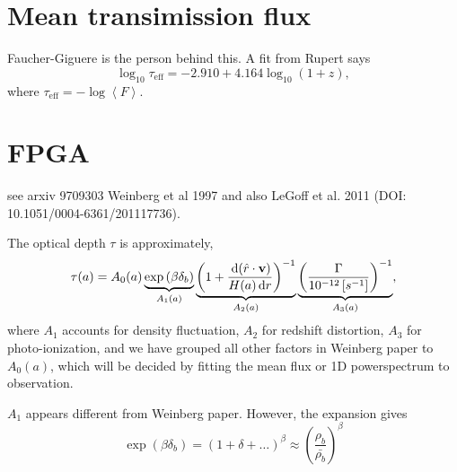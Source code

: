 \documentclass{paper}
\begin{document}
\section{Mean transimission flux}
Faucher-Giguere is the person behind this. A fit from Rupert
says
\[
        \log_{10} \tau_\mathrm{eff} = 
          -2.910 + 4.164 \log_{10} (1 + z),
\]
where $\tau_\mathrm{eff} = - \log \left<F\right> $.
\section{FPGA}
see arxiv 9709303 Weinberg et al 1997 and also  LeGoff et
al. 2011 (DOI: 10.1051/0004-6361/201117736).

The optical depth $\tau$ is approximately,
\[  \tau(a) = 
    A_0(a)
    \underbrace{
        \exp \left(\beta \delta_b \right)
    }_{A_1(a)}
    \underbrace{
        \left(1 + 
        \frac{\diff ( \hat{r} \cdot \mathbf{v})}
        {H(a) \diff r } \right)^{-1}
    }_{A_2(a)}
    \underbrace{
        \left(\frac{\Gamma}{\unit[10^{-12}][s^{-1}]}
        \right)^{-1}
    }_{A_3(a)}
    ,
\] where $A_1$ accounts for density fluctuation, 
         $A_2$ for redshift distortion, 
         $A_3$ for photo-ionization, 
   and we have grouped all other factors in Weinberg paper to $A_0(a)$, 
   which will be decided by fitting the mean flux or 1D
   powerspectrum to observation.

   $A_1$ appears different from Weinberg paper. However, the
   expansion gives
   \[ 
     \exp \left( \beta \delta_b \right)
     = (1 + \delta + \dots)^\beta
     \approx \left(\frac{\rho_b}{\bar{\rho_b}}\right)^\beta
   \]
\end{document}
